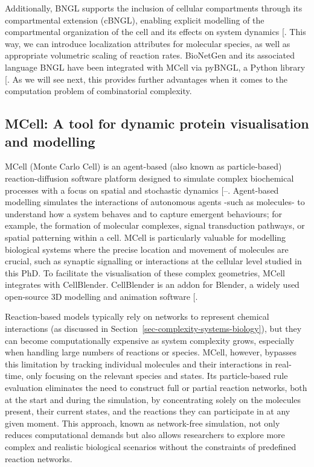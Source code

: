 \documentclass[
  11pt,
  letterpaper,
]{scrreprt}
\begin{document}
Additionally, BNGL supports the inclusion of cellular compartments
through its compartmental extension (cBNGL), enabling explicit modelling
of the compartmental organization of the cell and its effects on system
dynamics {[}\citeproc{ref-harris2009Compartmental}{286}{]}. This way, we
can introduce localization attributes for molecular species, as well as
appropriate volumetric scaling of reaction rates. BioNetGen and its
associated language BNGL have been integrated with MCell via pyBNGL, a
Python library {[}\citeproc{ref-husar2022MCell4}{244}{]}. As we will see
next, this provides further advantages when it comes to the computation
problem of combinatorial complexity.

\subsection*{MCell: A tool for dynamic protein visualisation and
modelling}\label{mcell-a-tool-for-dynamic-protein-visualisation-and-modelling}

MCell (Monte Carlo Cell) is an agent-based (also known as
particle-based) reaction-diffusion software platform designed to
simulate complex biochemical processes with a focus on spatial and
stochastic dynamics
{[}--\citeproc{ref-husar2022MCell4}{244}{]}.
Agent-based modelling simulates the interactions of autonomous agents
-such as molecules- to understand how a system behaves and to capture
emergent behaviours; for example, the formation of molecular complexes,
signal transduction pathways, or spatial patterning within a cell. MCell
is particularly valuable for modelling biological systems where the
precise location and movement of molecules are crucial, such as synaptic
signalling or interactions at the cellular level studied in this PhD. To
facilitate the visualisation of these complex geometries, MCell
integrates with CellBlender. CellBlender is an addon for Blender, a
widely used open-source 3D modelling and animation software
{[}\citeproc{ref-gupta2018Spatial}{297}{]}.

Reaction-based models typically rely on networks to represent chemical
interactions (as discussed in
Section~\ref{sec-complexity-systems-biology}), but they can become
computationally expensive as system complexity grows, especially when
handling large numbers of reactions or species. MCell, however, bypasses
this limitation by tracking individual molecules and their interactions
in real-time, only focusing on the relevant species and states. Its
particle-based rule evaluation eliminates the need to construct full or
partial reaction networks, both at the start and during the simulation,
by concentrating solely on the molecules present, their current states,
and the reactions they can participate in at any given moment. This
approach, known as network-free simulation, not only reduces
computational demands but also allows researchers to explore more
complex and realistic biological scenarios without the constraints of
predefined reaction networks.
\end{document}
